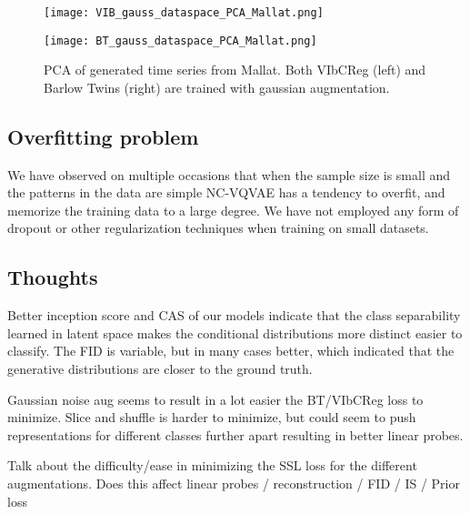 \documentclass[../../thesis.tex]{subfiles}
\begin{document}
\begin{figure}[H]
    \centering
    \begin{minipage}[b]{0.48\textwidth}
        \centering
        \texttt{[image: VIB\_gauss\_dataspace\_PCA\_Mallat.png]}
    \end{minipage}
    \begin{minipage}[b]{0.48\textwidth}
        \centering
        \texttt{[image: BT\_gauss\_dataspace\_PCA\_Mallat.png]}
    \end{minipage}
    \caption{PCA of generated time series from Mallat. Both VIbCReg (left) and Barlow Twins (right) are trained with gaussian augmentation.}
    \label{fig:Mallat_data_PCA}
\end{figure}


\subsection{Overfitting problem}

We have observed on multiple occasions that when the sample size is small and the patterns in the data are simple NC-VQVAE has a tendency to overfit, and memorize the training data to a large degree. We have not employed any form of dropout or other regularization techniques when training on small datasets. 

\subsection{Thoughts}

Better inception score and CAS of our models indicate that the class separability learned in latent space makes the conditional distributions more distinct easier to classify. The FID is variable, but in many cases better, which indicated that the generative distributions are closer to the ground truth.\newline

Gaussian noise aug seems to result in a lot easier the BT/VIbCReg loss to minimize. \newline
Slice and shuffle is harder to minimize, but could seem to push representations for different classes further apart resulting in better linear probes.\newline

Talk about the difficulty/ease in minimizing the SSL loss for the different augmentations. Does this affect linear probes / reconstruction / FID / IS / Prior loss
\newline
\end{document}
